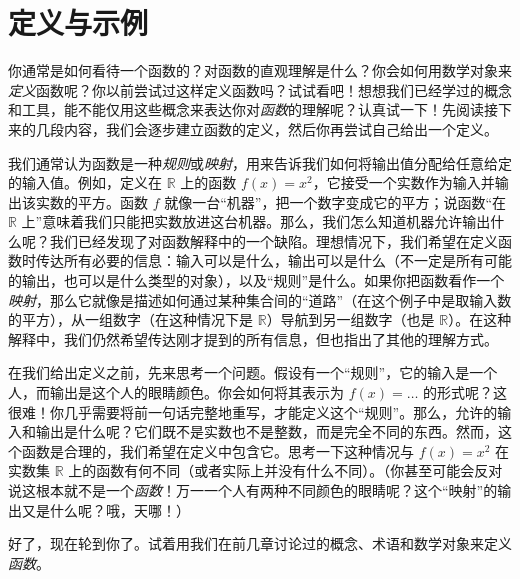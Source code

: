 \section{定义与示例}

你通常是如何看待一个函数的？对函数的直观理解是什么？你会如何用数学对象来\emph{定义}函数呢？你以前尝试过这样定义函数吗？试试看吧！想想我们已经学过的概念和工具，能不能仅用这些概念来表达你对\emph{函数}的理解呢？认真试一下！先阅读接下来的几段内容，我们会逐步建立函数的定义，然后你再尝试自己给出一个定义。

我们通常认为函数是一种\emph{规则}或\emph{映射}，用来告诉我们如何将输出值分配给任意给定的输入值。例如，定义在 $\mathbb{R}$ 上的函数 $f(x) = x^2$，它接受一个实数作为输入并输出该实数的平方。函数 $f$ 就像一台``机器''，把一个数字变成它的平方；说函数``在 $\mathbb{R}$ 上''意味着我们只能把实数放进这台机器。那么，我们怎么知道机器允许输出什么呢？我们已经发现了对函数解释中的一个缺陷。理想情况下，我们希望在定义函数时传达所有必要的信息：输入可以是什么，输出可以是什么（不一定是所有可能的输出，也可以是什么类型的对象），以及``规则''是什么。如果你把函数看作一个\emph{映射}，那么它就像是描述如何通过某种集合间的``道路''（在这个例子中是取输入数的平方），从一组数字（在这种情况下是 $\mathbb{R}$）导航到另一组数字（也是 $\mathbb{R}$）。在这种解释中，我们仍然希望传达刚才提到的所有信息，但也指出了其他的理解方式。

在我们给出定义之前，先来思考一个问题。假设有一个``规则''，它的输入是一个人，而输出是这个人的眼睛颜色。你会如何将其表示为 $f(x) = \dots$ 的形式呢？这很难！你几乎需要将前一句话完整地重写，才能定义这个``规则''。那么，允许的输入和输出是什么呢？它们既不是实数也不是整数，而是完全不同的东西。然而，这个函数是合理的，我们希望在定义中包含它。思考一下这种情况与 $f(x) = x^2$ 在实数集 $\mathbb{R}$ 上的函数有何不同（或者实际上并没有什么不同）。（你甚至可能会反对说这根本就不是一个\emph{函数}！万一一个人有两种不同颜色的眼睛呢？这个``映射''的输出又是什么呢？哦，天哪！）

好了，现在轮到你了。试着用我们在前几章讨论过的概念、术语和数学对象来定义\emph{函数}。









